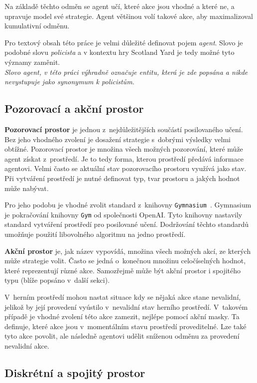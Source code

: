 Na základě těchto odměn se agent učí, které akce jsou vhodné a které ne, a upravuje model své strategie.
Agent většinou volí takové akce, aby maximalizoval kumulativní odměnu.

Pro textový obsah této práce je velmi důležité definovat pojem \emph{agent}.
Slovo je podobné slovu \emph{policista} a v kontextu hry Scotland Yard je tedy možné tyto významy zaměnit.\\
\emph{Slovo agent, v této práci výhradně označuje entitu, která je zde popsána a nikde nevystupuje jako synonymum k policistům.}

\subsection{Pozorovací a akční prostor}
\label{subsec:prostory}

\textbf{Pozorovací prostor} je jednou z~nejdůležitějších součástí posilovaného učení.
Bez jeho vhodného zvolení je dosažení strategie s~dobrými výsledky velmi obtížné.
Pozorovací prostor je množina všech možných pozorování, které může agent získat z~prostředí.
Je to tedy forma, kterou prostředí předává informace agentovi.
Velmi často se aktuální stav pozorovacího prostoru využívá jako stav.
Při vytváření prostředí je nutné definovat typ, tvar prostoru a jakých hodnot může nabývat.

Pro jeho podobu je vhodné zvolit standard z~knihovny \texttt{Gymnasium}~\cite{Gymnasium}.
Gymnasium je pokračování knihovny \texttt{Gym} od společnosti OpenAI\@.
Tyto knihovny nastavily standard vytváření prostředí pro posilované učení.
Dodržování těchto standardů umožňuje použití libovolného algoritmu na jedno prostředí.

\bigskip

\textbf{Akční prostor} je, jak název vypovídá, množina všech možných akcí, ze kterých může strategie volit.
Často se jedná o~konečnou množinu celočíselných hodnot, které reprezentují různé akce.
Samozřejmě může být akční prostor i spojitého typu (blíže popsáno v~další sekci).

V~herním prostředí mohou nastat situace kdy se nějaká akce stane nevalidní, jelikož by její provedení vyústilo v~nevalidní stav herního prostředí.
V~takovém případě je vhodné zvolení této akce zamezit, nejlépe pomocí akční masky.
Ta definuje, které akce jsou v~momentálním stavu prostředí proveditelné.
Lze také tyto akce povolit, ale následně agentovi udělit sníženou odměnu za provedení nevalidní akce.

\subsection{Diskrétní a spojitý prostor}\label{subsec:diskretni-a-spojity-prostor}

